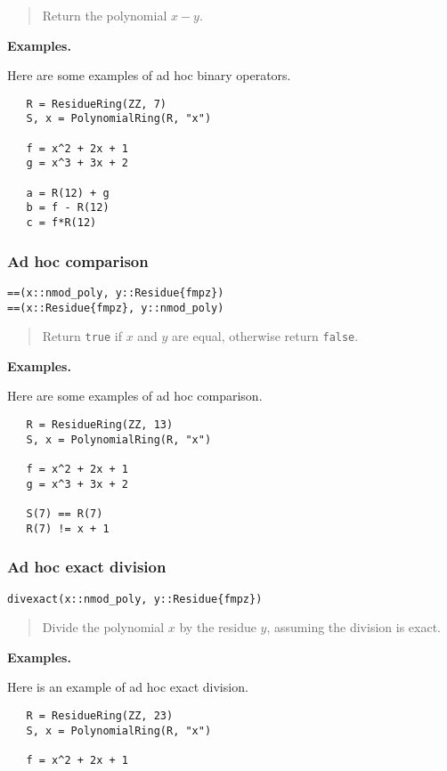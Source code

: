 \documentclass[a4paper,10pt]{article}
\newcommand{\code}{\lstinline}
\newcommand{\desc}[1]{\vspace{-3mm}\begin{quote}#1\end{quote}}
\begin{document}
{{\desc{Return the polynomial $x - y$.}

\textbf{Examples.}

Here are some examples of ad hoc binary operators.

\begin{lstlisting}
   R = ResidueRing(ZZ, 7)
   S, x = PolynomialRing(R, "x")

   f = x^2 + 2x + 1
   g = x^3 + 3x + 2

   a = R(12) + g
   b = f - R(12)
   c = f*R(12)
\end{lstlisting}

\subsubsection{Ad hoc comparison}

\begin{lstlisting}
==(x::nmod_poly, y::Residue{fmpz})
==(x::Residue{fmpz}, y::nmod_poly)
\end{lstlisting}

\desc{Return \code{true} if $x$ and $y$ are equal, otherwise return \code{false}.}

\textbf{Examples.}

Here are some examples of ad hoc comparison.

\begin{lstlisting}
   R = ResidueRing(ZZ, 13)
   S, x = PolynomialRing(R, "x")

   f = x^2 + 2x + 1
   g = x^3 + 3x + 2

   S(7) == R(7)
   R(7) != x + 1
\end{lstlisting}

\subsubsection{Ad hoc exact division}

\begin{lstlisting}
divexact(x::nmod_poly, y::Residue{fmpz})
\end{lstlisting}

\desc{Divide the polynomial $x$ by the residue $y$, assuming the division is exact.}

\textbf{Examples.}

Here is an example of ad hoc exact division.

\begin{lstlisting}
   R = ResidueRing(ZZ, 23)
   S, x = PolynomialRing(R, "x")

   f = x^2 + 2x + 1
   

\end{lstlisting}}}
\end{document}
